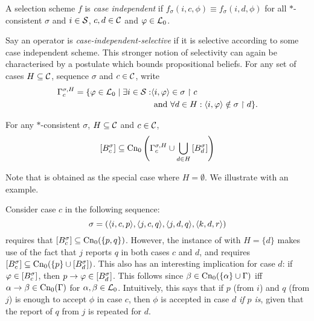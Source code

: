 \begin{definition}
    \label{def:case_independent_selectivity}
    A selection scheme $f$ is \emph{case independent} if $f_\sigma(i, c, \phi)
    \equiv f_\sigma(i, d, \phi)$ for all $\ast$-consistent $\sigma$ and $i \in
    \S$, $c, d \in \C$ and $\phi \in \lprop$.
\end{definition}

Say an operator is \emph{case-independent-selective} if it is selective
according to some case independent scheme. This stronger notion of selectivity
can again be characterised by a postulate which bounds propositional beliefs.
For any set of cases $H \subseteq \C$, sequence $\sigma$ and $c \in \C$, write
\begin{align*}
    \Gamma^{\sigma,H}_c
    = \{
        \phi \in \lprop
        \mid
        \exists i \in \S:
            &\tuple{i, \phi} \in \sigma \rs c \\
            &\text{ and }
            \forall d \in H : \tuple{i, \phi} \notin \sigma \rs d
    \}.
\end{align*}

\begin{postulate}[\hboundedness{}]
    For any $\ast$-consistent $\sigma$, $H \subseteq \C$ and $c \in \C$,
    \[
        \proppart{B^\sigma_c}
            \subseteq
            \cnprop\left(
                \Gamma^{\sigma,H}_c
                \cup
                \bigcup_{d \in H}{
                    \proppart{B^\sigma_d}
                }
            \right)
    \]
\end{postulate}

Note that \boundedness{} is obtained as the special case where $H =
\emptyset$. We illustrate with an example.

\begin{example}
    \label{ex:hprop}
    Consider case $c$ in the following sequence:
    \[
        \sigma
        = (
            \tuple{i, c, p},
            \tuple{j, c, q},
            \tuple{j, d, q},
            \tuple{k, d, r}
        )
    \]
    \boundedness{} requires that $\proppart{B^\sigma_c} \subseteq \cnprop(\{p,
    q\})$. However, the instance of \hboundedness{} with $H = \{d\}$ makes use
    of the fact that $j$ reports $q$ in both cases $c$ and $d$, and requires
    $\proppart{B^\sigma_c} \subseteq \cnprop(\{p\} \cup
    \proppart{B^\sigma_d})$.
    This also has an interesting implication for case $d$: if $\phi \in
    \proppart{B^\sigma_c}$, then $p \rightarrow \phi \in
    \proppart{B^\sigma_d}$. This follows since $\beta \in \cnprop(\{\alpha\}
    \cup \Gamma)$ iff $\alpha \rightarrow \beta \in \cnprop(\Gamma)$ for
    $\alpha, \beta \in \lprop$.
    Intuitively, this says that if $p$ (from $i$) and $q$
    (from $j$) is enough to accept $\phi$ in case $c$, then $\phi$ is
    accepted in case $d$ \emph{if $p$ is}, given that the report of $q$ from
    $j$ is repeated for $d$.

\end{example}

